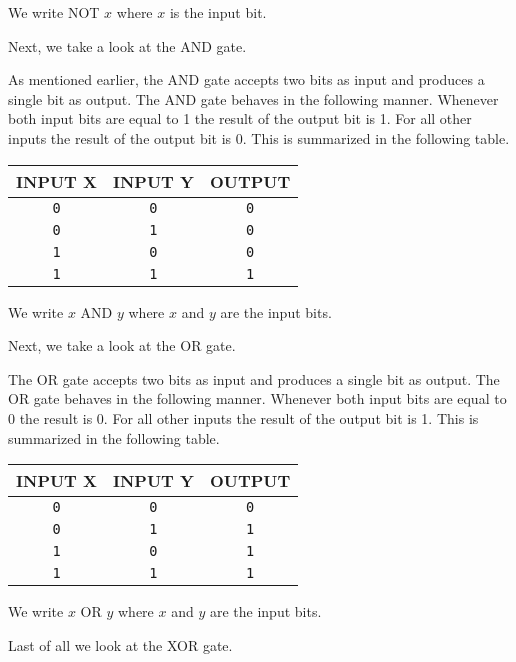 We write NOT $x$ where $x$ is the input bit.

Next, we take a look at the AND gate.

As mentioned earlier, the AND gate accepts two bits as input and produces a single bit as output. The AND gate behaves in the following manner. Whenever both input bits are equal to 1 the result of the output bit is 1. For all other inputs the result of the output bit is 0. This is summarized in the following table.
\begin{center}
	\begin{tabular}{cc|c}
	  \hline
		INPUT X & INPUT Y & OUTPUT \\ \hline
		\texttt{0} & \texttt{0} & \texttt{0} \\ \hline
		\texttt{0} & \texttt{1} & \texttt{0} \\ \hline
		\texttt{1} & \texttt{0} & \texttt{0} \\ \hline
		\texttt{1} & \texttt{1} & \texttt{1} \\ \hline
	\end{tabular}
\end{center}

We write $x$ AND $y$ where $x$ and $y$ are the input bits.

Next, we take a look at the OR gate.

The OR gate accepts two bits as input and produces a single bit as output. The OR gate behaves in the following manner. Whenever both input bits are equal to 0 the result is 0. For all other inputs the result of the output bit is 1. This is summarized in the following table.
\begin{center}
	\begin{tabular}{cc|c}
	  \hline
		INPUT X & INPUT Y & OUTPUT \\ \hline
		\texttt{0} & \texttt{0} & \texttt{0} \\ \hline
		\texttt{0} & \texttt{1} & \texttt{1} \\ \hline
		\texttt{1} & \texttt{0} & \texttt{1} \\ \hline
		\texttt{1} & \texttt{1} & \texttt{1} \\ \hline
	\end{tabular}
\end{center}

We write $x$ OR $y$ where $x$ and $y$ are the input bits.

Last of all we look at the XOR gate.

